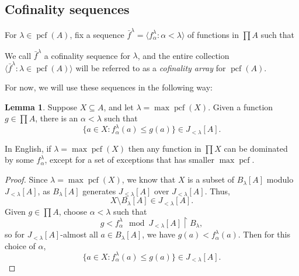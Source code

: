 \documentclass[10pt]{amsart}
\theoremstyle{plain}
\theoremstyle{definition}
\newtheorem{lemma}[proposition]{Lemma}
\theoremstyle{remark}
\DeclareMathOperator{\pcf}{pcf}
\newcommand{\sk}{\vskip.05in}
\numberwithin{equation}{section}
\begin{document}
\subsection{Cofinality sequences}



For $\lambda\in\pcf(A)$,  fix a sequence $\bar{f}^\lambda=\langle f^\lambda_\alpha:\alpha<\lambda\rangle$ of functions in $\prod A$ such that

We call $\bar{f}^\lambda$ a cofinality sequence for $\lambda$, and the entire collection $\langle \bar{f}^\lambda:\lambda\in\pcf(A)\rangle$ will be referred to as a {\em cofinality array} for $\pcf(A)$.

For now, we will use these sequences in the following way:

\begin{lemma}
\label{lem4}
Suppose $X\subseteq A$, and let $\lambda = \max\pcf(X)$.  Given a function $g\in\prod A$, there is an $\alpha<\lambda$ such that
\begin{equation}
\{a\in X: f^\lambda_\alpha(a)\leq g(a)\}\in J_{<\lambda}[A].
\end{equation}
\end{lemma}
In English, if $\lambda = \max\pcf(X)$ then any function in $\prod X$ can be dominated by some $f^\lambda_\alpha$, except for a set of exceptions that has smaller $\max\pcf$.


\begin{proof}
Since $\lambda = \max\pcf(X)$, we know that $X$ is a subset of $B_\lambda[A]$ modulo $J_{<\lambda}[A]$, as $B_\lambda[A]$ generates $J_{\leq\lambda}[A]$ over $J_{<\lambda}[A]$.  Thus,
\begin{equation}
X\setminus B_{\lambda}[A]\in J_{<\lambda}[A].
\end{equation}
Given $g\in\prod A$, choose $\alpha<\lambda$ such that
\begin{equation}
g<f^\lambda_\alpha\mod J_{<\lambda}[A]\restriction B_\lambda,
\end{equation}
so for $J_{<\lambda}[A]$-almost all $a\in B_\lambda[A]$, we have $g(a)< f^\lambda_\alpha(a)$.
Then for this choice of $\alpha$,
\begin{equation}
\{a\in X: f^\lambda_\alpha(a)\leq g(a)\}\in J_{<\lambda}[A].
\end{equation}
\end{proof}
\end{document}
